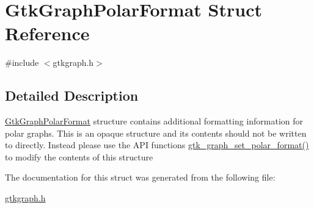 \hypertarget{struct_gtk_graph_polar_format}{
\section{GtkGraphPolarFormat Struct Reference}
\label{struct_gtk_graph_polar_format}
}


{\ttfamily \#include $<$gtkgraph.h$>$}



\subsection{Detailed Description}
\hyperlink{struct_gtk_graph_polar_format}{GtkGraphPolarFormat} structure contains additional formatting information for polar graphs. This is an opaque structure and its contents should not be written to directly. Instead please use the API functions \hyperlink{gtkgraph_8h_af0f641802393c6a19f247581726840d9}{gtk\_\-graph\_\-set\_\-polar\_\-format()} to modify the contents of this structure 

The documentation for this struct was generated from the following file:\begin{DoxyCompactItemize}
\item 
\hyperlink{gtkgraph_8h}{gtkgraph.h}\end{DoxyCompactItemize}
